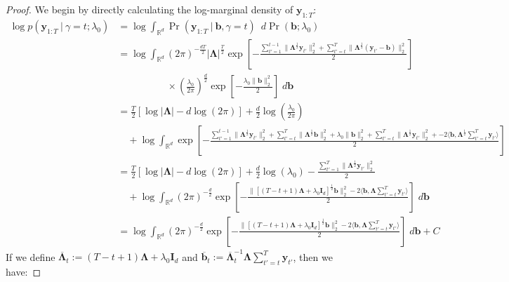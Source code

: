 \begin{proof}
We begin by directly calculating the log-marginal density of $\mathbf{y}_{1:T}$: 
\small
\begin{align*}
    \log p(\mathbf{y}_{1:T} \:|\:\gamma = t ; \lambda_0) &= \log \int_{\mathbb{R}^d} \Pr(\mathbf{y}_{1:T} \:|\:\mathbf{b},\gamma = t) \:\; d\Pr(\mathbf{b};\lambda_0) \\
    &= \log \int_{\mathbb{R}^d} (2\pi)^{-\frac{dT}{2}}|\boldsymbol{\Lambda}|^\frac{T}{2} \exp\left[-\frac{\sum_{t'=1}^{t-1} \lVert\boldsymbol{\Lambda}^{\frac{1}{2}}\mathbf{y}_{t'}\rVert_2^2 + \sum_{t'=t}^{T} \lVert\boldsymbol{\Lambda}^{\frac{1}{2}}(\mathbf{y}_{t'} - \mathbf{b})\rVert_2^2}{2}\right] \\
    &\quad\quad\quad\quad\quad\times \left(\frac{\lambda_0}{2\pi}\right)^{\frac{d}{2}}\exp\left[-\frac{\lambda_0\lVert\mathbf{b}\rVert_2^2}{2}\right] \; d\mathbf{b} \\
    &= \frac{T}{2}\left[\log|\boldsymbol{\Lambda}| - d\log(2\pi)\right] + \frac{d}{2}\log \left(\frac{\lambda_0}{2\pi}\right)\\
    &\quad + \log \int_{\mathbb{R}^d} \exp\left[-\frac{\sum_{t'=1}^{t-1} \lVert\boldsymbol{\Lambda}^{\frac{1}{2}}\mathbf{y}_{t'}\rVert_2^2 + \sum_{t'=t}^{T} \lVert\boldsymbol{\Lambda}^{\frac{1}{2}}\mathbf{b}\rVert_2^2 +\lambda_0 \lVert\mathbf{b}\rVert_2^2 + \sum_{t'=t}^{T} \lVert\boldsymbol{\Lambda}^{\frac{1}{2}}\mathbf{y}_{t'}\rVert_2^2 + -2\langle \mathbf{b}, \boldsymbol{\Lambda}^{\frac{1}{2}} \sum_{t'=t}^T\mathbf{y}_{t'}\rangle}{2}\right] \\
    &=  \frac{T}{2}\left[\log|\boldsymbol{\Lambda}| - d\log(2\pi)\right] + \frac{d}{2}\log \left(\lambda_0\right) - \frac{\sum_{t'=1}^T \lVert\boldsymbol{\Lambda}^{\frac{1}{2}}\mathbf{y}_{t'}\rVert_2^2}{2} \\
    &\quad + \log \int_{\mathbb{R}^d} (2\pi)^{-\frac{d}{2}}\exp\left[-\frac{\lVert[(T-t+1)\boldsymbol{\Lambda} + \lambda_0\mathbf{I}_d]^{\frac{1}{2}}\mathbf{b}\rVert_2^2-2\langle \mathbf{b}, \boldsymbol{\Lambda} \sum_{t'=t}^T\mathbf{y}_{t'}\rangle}{2}\right] \; d\mathbf{b}\\ 
    &= \log \int_{\mathbb{R}^d} (2\pi)^{-\frac{d}{2}}\exp\left[-\frac{\lVert[(T-t+1)\boldsymbol{\Lambda} + \lambda_0\mathbf{I}_d]^{\frac{1}{2}}\mathbf{b}\rVert_2^2-2\langle \mathbf{b}, \boldsymbol{\Lambda} \sum_{t'=t}^T\mathbf{y}_{t'}\rangle}{2}\right] \; d\mathbf{b} + C \tag{$C$ constant independent of $\gamma$}
\end{align*}
\normalsize
If we define $\overline{\boldsymbol{\Lambda}}_t := (T-t+1)\boldsymbol{\Lambda} + \lambda_0\mathbf{I}_d$ and $\overline{\mathbf{b}}_t := \overline{\boldsymbol{\Lambda}}^{-1}_t \boldsymbol{\Lambda} \sum_{t'=t}^T \mathbf{y}_{t'}$, then we have:

\end{proof}
